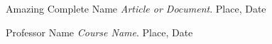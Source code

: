 \begin{thebibliography}{10}

        Amazing Complete Name
        \textit{Article or Document}. 
        Place, Date

        Professor Name
        \textit{Course Name}. 
        Place, Date

\end{thebibliography}